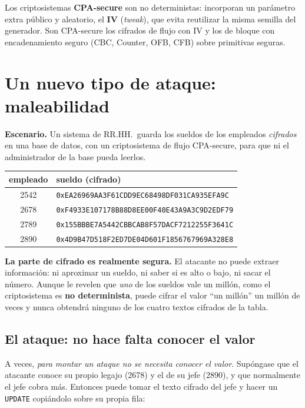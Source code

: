 \documentclass[11pt,a4paper]{article}
\begin{document}
Los criptosistemas \textbf{CPA-secure} son no deterministas: incorporan un parámetro extra
público y aleatorio, el \textbf{IV} (\emph{tweak}), que evita reutilizar la misma semilla del
generador. Son CPA-secure los cifrados de flujo con IV y los de bloque con encadenamiento
seguro (CBC, Counter, OFB, CFB) sobre primitivas seguras.

\section{Un nuevo tipo de ataque: maleabilidad}

\begin{slidebox}
\textbf{Escenario.} Un sistema de RR.HH.\ guarda los sueldos de los empleados
\emph{cifrados} en una base de datos, con un criptosistema de flujo CPA-secure, para que ni
el administrador de la base pueda leerlos.
\end{slidebox}

\begin{center}
\renewcommand{\arraystretch}{1.3}
\begin{tabular}{c l}
\toprule
\textbf{empleado} & \textbf{sueldo (cifrado)}\\
\midrule
2542 & \texttt{0xEA26969AA3F61CDD9EC68498DF031CA935EFA9C}\\
2678 & \texttt{0xF4933E107178B88D8EE00F40E43A9A3C9D2EDF79}\\
2789 & \texttt{0x155BBBE7A5442CBBCAB8F57DACF7212255F3641C}\\
2890 & \texttt{0x4D9B47D518F2ED7DE04D601F1856767969A328E8}\\
\bottomrule
\end{tabular}
\end{center}

\textbf{La parte de cifrado es realmente segura.} El atacante no puede extraer información:
ni aproximar un sueldo, ni saber si es alto o bajo, ni sacar el número. Aunque le revelen que
\emph{uno} de los sueldos vale un millón, como el criptosistema es \textbf{no determinista},
puede cifrar el valor ``un millón'' un millón de veces y nunca obtendrá ninguno de los cuatro
textos cifrados de la tabla.

\subsection{El ataque: no hace falta conocer el valor}
A veces, \emph{para montar un ataque no se necesita conocer el valor}. Supóngase que el
atacante conoce su propio legajo (2678) y el de su jefe (2890), y que normalmente el jefe
cobra más. Entonces puede tomar el texto cifrado del jefe y hacer un \texttt{UPDATE}
copiándolo sobre su propia fila:
\end{document}
